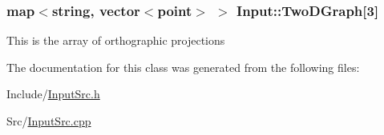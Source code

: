 \subsubsection[{\texorpdfstring{Two\+D\+Graph}{TwoDGraph}}]{\setlength{\rightskip}{0pt plus 5cm}map$<$string, vector$<${\bf point}$>$ $>$ Input\+::\+Two\+D\+Graph\mbox{[}3\mbox{]}}\hypertarget{classInput_a55526617adbcb0db4b3d565f4dbe772d}{}\label{classInput_a55526617adbcb0db4b3d565f4dbe772d}
This is the array of orthographic projections 

The documentation for this class was generated from the following files\+:\begin{DoxyCompactItemize}
\item 
Include/\hyperlink{InputSrc_8h}{Input\+Src.\+h}\item 
Src/\hyperlink{InputSrc_8cpp}{Input\+Src.\+cpp}\end{DoxyCompactItemize}
